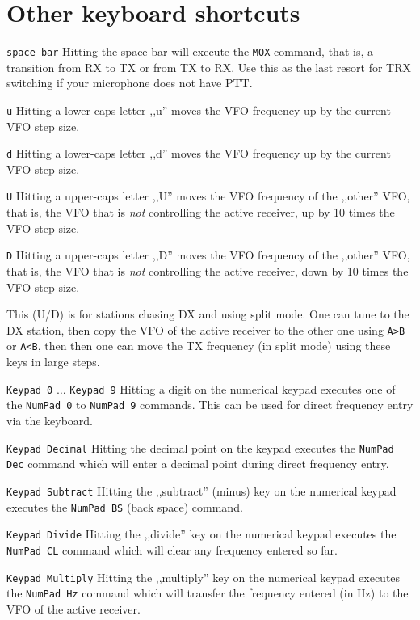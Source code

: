 \documentclass[12pt]{book}
\def\rett#1{\texttt{\color{red}#1}}
\def\bltt#1{\texttt{\color{blue}#1}}
\begin{document}
\section{Other keyboard shortcuts}

\rett{space bar} Hitting the space bar will execute the \bltt{MOX} command, that is, a
transition from RX to TX or from TX to RX. Use this as the last resort for TRX switching
if your microphone does not have PTT.

\rett{u} Hitting a lower-caps letter ,,u'' moves the VFO frequency up by the current VFO
step size.

\rett{d} Hitting a lower-caps letter ,,d'' moves the VFO frequency up by the current VFO
step size.

\rett{U} Hitting a upper-caps letter ,,U'' moves the VFO frequency of the ,,other'' VFO, that is,
the VFO that is \textit{not} controlling the active receiver, up by 10 times the VFO step size.

\rett{D} Hitting a upper-caps letter ,,D'' moves the VFO frequency of the ,,other'' VFO, that is,
the VFO that is \textit{not} controlling the active receiver, down by 10 times the VFO step size.

This (U/D) is for stations chasing DX and using split mode. One can tune to the DX station,
then copy the VFO of the active receiver to the other one using \bltt{A>B} or \bltt{A<B}, then then
one can  move the TX frequency (in split mode) using these keys in large steps.

\rett{Keypad 0} $\ldots$ \rett{Keypad 9} Hitting a digit on the numerical keypad executes one of the
\bltt{NumPad 0} to \bltt{NumPad 9} commands. This can be used for direct frequency entry
via the keyboard.

\rett{Keypad Decimal} Hitting the decimal point on the keypad executes the \bltt{NumPad Dec}
command which will enter a decimal point during direct frequency entry.

\rett{Keypad Subtract} Hitting the ,,subtract'' (minus) key on the numerical keypad executes the
\bltt{NumPad BS} (back space) command.

\rett{Keypad Divide} Hitting the ,,divide'' key on the numerical keypad executes the \bltt{NumPad CL}
command which will clear any frequency entered so far.

\rett{Keypad Multiply} Hitting the ,,multiply'' key on the numerical keypad executes the \bltt{NumPad Hz}
command which will transfer the frequency entered (in Hz) to the VFO of the active receiver.
\end{document}
